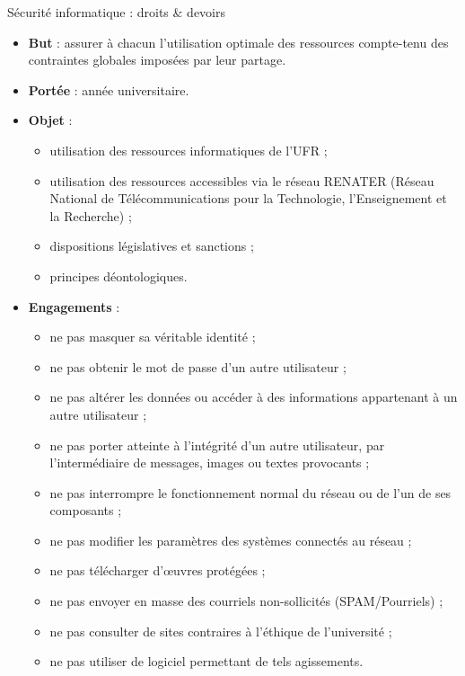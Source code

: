 \documentclass [xcolor=x11names,t] {beamer}
\begin{document}
\begin{frame}{Sécurité informatique : droits \& devoirs}
	\begin{itemize}
		\item \textbf{But} : assurer à chacun l’utilisation optimale des ressources compte-tenu des contraintes globales imposées par leur partage.
		\item \textbf{Portée} : année universitaire.
		\item \textbf{Objet} : 
		\begin{itemize}
			\item utilisation des ressources informatiques de l’UFR ;
			\item utilisation des ressources accessibles via le réseau RENATER (Réseau National de Télécommunications pour la Technologie, l’Enseignement et la Recherche) ;
			\item dispositions législatives et sanctions ;
			\item principes déontologiques.
		\end{itemize}
		\item \textbf{Engagements }:
		\begin{itemize}
			\item ne pas masquer sa véritable identité ;
			\item ne pas obtenir le mot de passe d’un autre utilisateur ;
			\item ne pas altérer les données ou accéder à des informations appartenant à un autre utilisateur ;
			\item ne pas porter atteinte à l’intégrité d’un autre utilisateur, par l’intermédiaire de messages, images ou textes provocants ;
			\item ne pas interrompre le fonctionnement normal du réseau ou de l’un de ses composants ;
			\item ne pas modifier les paramètres des systèmes connectés au réseau ;
			\item ne pas télécharger d’œuvres protégées ;
			\item ne pas envoyer en masse des courriels non-sollicités (SPAM/Pourriels) ;
			\item ne pas consulter de sites contraires à l’éthique de l’université ;
			\item ne pas utiliser de logiciel permettant de tels agissements.
			
		\end{itemize} 
		

	\end{itemize}
\end{frame}
\end{document}
